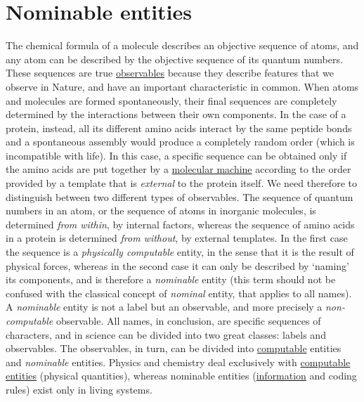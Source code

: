 \documentclass[12pt]{article}
\begin{document}
\section{Nominable entities}
The chemical formula of a molecule describes an objective sequence of atoms, and any atom can be described by the objective sequence of its quantum numbers. These sequences are true \hyperlink{observables}{observables} because they describe features that we observe in Nature, and have an important characteristic in common. When atoms and molecules are formed spontaneously, their final sequences are completely determined by the interactions between their own components. In the case of a protein, instead, all its different amino acids interact by the same peptide bonds and a spontaneous assembly would produce a completely random order (which is incompatible with life). In this case, a specific sequence can be obtained only if the amino acids are put together by a \hyperlink{molecular_machines}{molecular machine} according to the order provided by a template that is \textit{external} to the protein itself. We need therefore to distinguish between two different types of observables. The sequence of quantum numbers in an atom, or the sequence of atoms in inorganic molecules, is determined \textit{from within}, by internal factors, whereas the sequence of amino acids in a protein is determined \textit{from without}, by external templates. In the first case the sequence is a \textit{physically computable} entity, in the sense that it is the result of physical forces, whereas in the second case it can only be described by `naming' its components, and is therefore a \textit{nominable} entity (this term should not be confused with the classical concept of \textit{nominal} entity, that applies to all names). A \textit{nominable} entity is not a label but an observable, and more precisely a \textit{non-computable} observable. All names, in conclusion, are specific sequences of characters, and in science can be divided into two great classes: labels and observables. The observables, in turn, can be divided into \hyperlink{computable_entities}{computable} entities and \textit{nominable} entities. Physics and chemistry deal exclusively with \hyperlink{computable_entities}{computable entities} (\hypertarget{physical_quantities}{physical quantities}), whereas nominable entities (\hyperlink{organic_information}{information} and coding rules) exist only in living systems. 
 

\hypertarget{observables}{}
\end{document}
